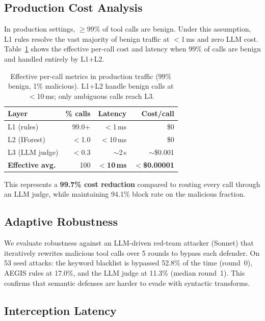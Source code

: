 \documentclass[sigconf,nonacm]{acmart}
\begin{document}
\subsection{Production Cost Analysis}

In production settings, $\ge$99\% of tool calls are benign. Under this assumption, L1 rules resolve the vast majority of benign traffic at $<$1\,ms and zero LLM cost. Table~\ref{tab:production} shows the effective per-call cost and latency when 99\% of calls are benign and handled entirely by L1+L2.

\begin{table}[t]
\centering\small
\caption{Effective per-call metrics in production traffic (99\% benign, 1\% malicious). L1+L2 handle benign calls at $<$10\,ms; only ambiguous calls reach L3.}
\vspace{-0.1in}
\label{tab:production}
\begin{tabular}{lrrr}
\toprule
Layer & \% calls & Latency & Cost/call \\
\midrule
L1 (rules) & 99.0+ & $<$1\,ms & \$0 \\
L2 (IForest) & $<$1.0 & $<$10\,ms & \$0 \\
L3 (LLM judge) & $<$0.3 & $\sim$2\,s & $\sim$\$0.001 \\
\midrule
\textbf{Effective avg.} & 100 & $<$\textbf{10\,ms} & $<$\textbf{\$0.00001} \\
\bottomrule
\end{tabular}
\vspace{-0.1in}
\end{table}

This represents a \textbf{99.7\% cost reduction} compared to routing every call through an LLM judge, while maintaining 94.1\% block rate on the malicious fraction.

\subsection{Adaptive Robustness}

We evaluate robustness against an LLM-driven red-team attacker (Sonnet) that iteratively rewrites malicious tool calls over 5 rounds to bypass each defender. On 53 seed attacks: the keyword blacklist is bypassed 52.8\% of the time (round~0), AEGIS rules at 17.0\%, and the LLM judge at 11.3\% (median round~1). This confirms that semantic defenses are harder to evade with syntactic transforms.

\subsection{Interception Latency}
\end{document}
